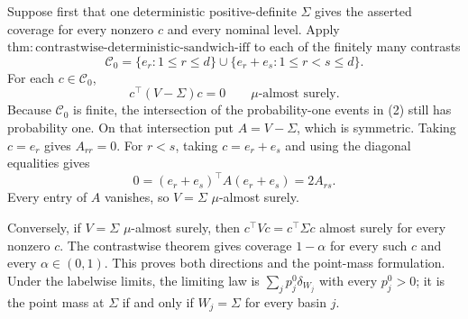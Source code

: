 Suppose first that one deterministic positive-definite \(\Sigma\) gives the asserted coverage for every nonzero \(c\) and every nominal level. Apply \(\mathrm{thm:contrastwise\text{-}deterministic\text{-}sandwich\text{-}iff}\) to each of the finitely many contrasts
\[
 \mathcal C_0=\{e_r:1\le r\le d\}\cup
 \{e_r+e_s:1\le r<s\le d\}. \tag{1}
\]
For each \(c\in\mathcal C_0\),
\[
 c^\top(V-\Sigma)c=0\qquad\mu\text{-almost surely}. \tag{2}
\]
Because \(\mathcal C_0\) is finite, the intersection of the probability-one events in (2) still has probability one. On that intersection put \(A=V-\Sigma\), which is symmetric. Taking \(c=e_r\) gives \(A_{rr}=0\). For \(r<s\), taking \(c=e_r+e_s\) and using the diagonal equalities gives
\[
 0=(e_r+e_s)^\top A(e_r+e_s)=2A_{rs}. \tag{3}
\]
Every entry of \(A\) vanishes, so \(V=\Sigma\) \(\mu\)-almost surely.

Conversely, if \(V=\Sigma\) \(\mu\)-almost surely, then \(c^\top Vc=c^\top\Sigma c\) almost surely for every nonzero \(c\). The contrastwise theorem gives coverage \(1-\alpha\) for every such \(c\) and every \(\alpha\in(0,1)\). This proves both directions and the point-mass formulation. Under the labelwise limits, the limiting law is \(\sum_jp_j^0\delta_{W_j}\) with every \(p_j^0>0\); it is the point mass at \(\Sigma\) if and only if \(W_j=\Sigma\) for every basin \(j\).